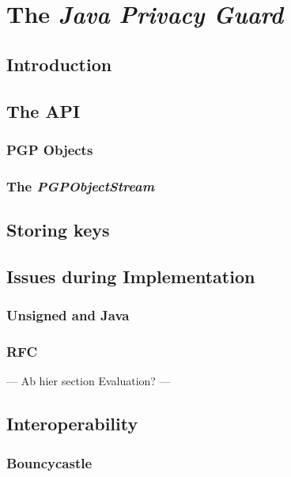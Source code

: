 \chapter{The \textit{Java Privacy Guard}}

\section{Introduction}


\section{The API}

\subsection{PGP Objects}

\subsection{The \textit{PGPObjectStream}}


\section{Storing keys}


\section{Issues during Implementation}

\subsection{Unsigned and Java}

\subsection{RFC}

--- Ab hier section Evaluation? ---

\section{Interoperability}

\subsection{Bouncycastle}

